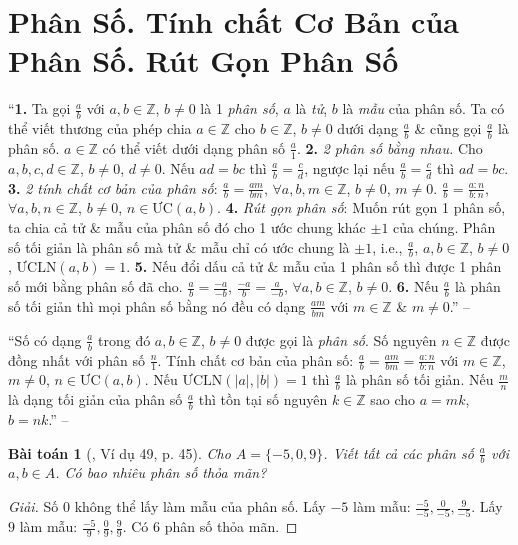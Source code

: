\documentclass{article}
\numberwithin{equation}{section}
\newtheorem{baitoan}{Bài toán}
\begin{document}
\section{Phân Số. Tính chất Cơ Bản của Phân Số. Rút Gọn Phân Số}
``\textbf{1.} Ta gọi $\frac{a}{b}$ với $a,b\in\mathbb{Z}$, $b\ne0$ là 1 \textit{phân số}, $a$ là \textit{tử}, $b$ là \textit{mẫu} của phân số. Ta có thể viết thương của phép chia $a\in\mathbb{Z}$ cho $b\in\mathbb{Z}$, $b\ne 0$ dưới dạng $\frac{a}{b}$ \& cũng gọi $\frac{a}{b}$ là phân số. $a\in\mathbb{Z}$ có thể viết dưới dạng phân số $\frac{a}{1}$. \textbf{2.} \textit{2 phân số bằng nhau.} Cho $a,b,c,d\in\mathbb{Z}$, $b\ne0$, $d\ne 0$. Nếu $ad = bc$ thì $\frac{a}{b} = \frac{c}{d}$, ngược lại nếu $\frac{a}{b} = \frac{c}{d}$ thì $ad = bc$. \textbf{3.} \textit{2 tính chất cơ bản của phân số}: $\frac{a}{b} = \frac{am}{bm}$, $\forall a,b,m\in\mathbb{Z}$, $b\ne0$, $m\ne0$. $\frac{a}{b} = \frac{a:n}{b:n}$, $\forall a,b,n\in\mathbb{Z}$, $b\ne0$, $n\in\mbox{ƯC}(a,b)$. \textbf{4.} \textit{Rút gọn phân số}: Muốn rút gọn 1 phân số, ta chia cả tử \& mẫu của phân số đó cho 1 ước chung khác $\pm1$ của chúng. Phân số tối giản là phân số mà tử \& mẫu chỉ có ước chung là $\pm1$, i.e., $\frac{a}{b}$, $a,b\in\mathbb{Z}$, $b\ne0$, $\mbox{ƯCLN}(a,b) = 1$. \textbf{5.} Nếu đổi dấu cả tử \& mẫu của 1 phân số thì được 1 phân số mới bằng phân số đã cho. $\frac{a}{b} = \frac{-a}{-b}$, $\frac{-a}{b} = \frac{a}{-b}$, $\forall a,b\in\mathbb{Z}$, $b\ne0$. \textbf{6.} Nếu $\frac{a}{b}$ là phân số tối giản thì mọi phân số bằng nó đều có dạng $\frac{am}{bm}$ với $m\in\mathbb{Z}$ \& $m\ne0$.'' -- \cite[Chap. 3, \S1, p. 45]{Tuyen_Toan_6}

``Số có dạng $\frac{a}{b}$ trong đó $a,b\in\mathbb{Z}$, $b\ne0$ được gọi là \textit{phân số}. Số nguyên $n\in\mathbb{Z}$ được đồng nhất với phân số $\frac{n}{1}$. Tính chất cơ bản của phân số: $\frac{a}{b} = \frac{am}{bm} = \frac{a:n}{b:n}$ với $m\in\mathbb{Z}$, $m\ne0$, $n\in\mbox{ƯC}(a,b)$. Nếu $\mbox{ƯCLN}(|a|,|b|) = 1$ thì $\frac{a}{b}$ là phân số tối giản. Nếu $\frac{m}{n}$ là dạng tối giản của phân số $\frac{a}{b}$ thì tồn tại số nguyên $k\in\mathbb{Z}$ sao cho $a = mk$, $b = nk$.'' -- \cite[Chap. III, \S1, p. 4]{Binh_Toan_6_tap_2}

\begin{baitoan}[\cite{Tuyen_Toan_6}, Ví dụ 49, p. 45]
	Cho $A = \{-5,0,9\}$. Viết tất cả các phân số $\frac{a}{b}$ với $a,b\in A$. Có bao nhiêu phân số thỏa mãn?
\end{baitoan}

\begin{proof}[Giải]
	Số $0$ không thể lấy làm mẫu của phân số. Lấy $-5$ làm mẫu: $\frac{-5}{-5},\frac{0}{-5},\frac{9}{-5}$. Lấy $9$ làm mẫu: $\frac{-5}{9},\frac{0}{9},\frac{9}{9}$. Có $6$ phân số thỏa mãn.
\end{proof}
\end{document}
